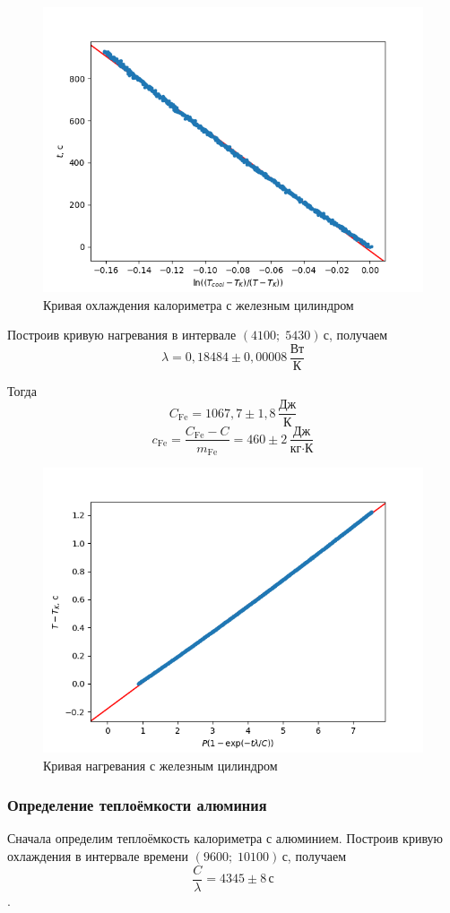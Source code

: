 \documentclass[a4paper, 12pt]{article}
\begin{document}
    \begin{figure}[ht!]
        \centering\includegraphics[width=0.6\linewidth]{img/lcf.png}
        \caption{Кривая охлаждения калориметра с железным цилиндром}
    \end{figure}

    Построив кривую нагревания в интервале $(4100;\;5430)\,\text{с}$, получаем
    $$\lambda=0{,}18484\pm 0{,}00008\,\frac{\text{Вт}}{\text{К}}$$

    Тогда $$C_\text{Fe}=1067{,}7\pm 1{,}8\,\frac{\text{Дж}}{\text{К}}$$
    $$c_\text{Fe}=\frac{C_\text{Fe}-C}{m_\text{Fe}}=460\pm 2\,\frac{\text{Дж}}{\text{кг}\cdot\text{К}}$$

    \begin{figure}[ht!]
        \centering\includegraphics[width=0.6\linewidth]{img/lhf.png}
        \caption{Кривая нагревания с железным цилиндром}
    \end{figure}

    \subsubsection{Определение теплоёмкости алюминия}
    Сначала определим теплоёмкость калориметра с алюминием.
    Построив кривую охлаждения в интервале времени $(9600;\;10100)\,\text{с}$,
    получаем $$\frac{C}{\lambda}=4345\pm 8\,\text{с}$$.
\end{document}
